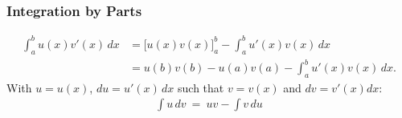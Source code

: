 \subsubsection{Integration by Parts} 
\begin{align}
  \int_a^b u(x) v'(x) \, dx 
  & = \Big[u(x) v(x)\Big]_a^b - \int_a^b u'(x) v(x) \, dx\\[6pt]
  & = u(b) v(b) - u(a) v(a) - \int_a^b u'(x) v(x) \, dx.
\end{align}
With $u = u(x)$, $du = u'(x) \,dx$ such that $v = v(x)$ and $dv = v'(x) dx$:
\begin{align}
  \int u \, dv \ =\ uv - \int v \, du
\end{align}
